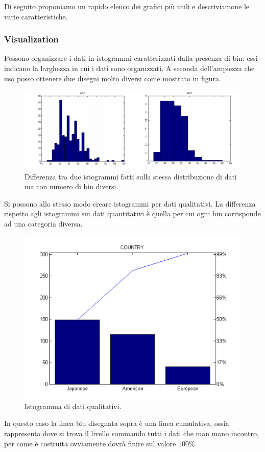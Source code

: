 Di seguito proponiamo un rapido elenco dei grafici più utili e descriviamone le varie caratteristiche.

\subsubsection{Visualization}

Possono organizzare i dati in istogrammi caratterizzati dalla presenza di bin: essi indicano la larghezza in cui i dati sono organizzati. A seconda dell'ampiezza che uso posso ottenere due disegni molto diversi come mostrato in figura.


\begin{figure}[H]
	\centering
	\includegraphics[height=0.35 \linewidth]{introduction/pict/istogramma_quant.png}
	\caption{Differenza tra due istogrammi fatti sulla stessa distribuzione di dati ma con numero di bin diversi.}
\end{figure}


Si possono allo stesso modo creare istogrammi per dati qualitativi. La differenza rispetto agli istogrammi sui dati quantitativi è quella per cui ogni bin corrisponde ad una categoria diversa.

\begin{figure}[H]
	\centering
	\includegraphics[height=0.3 \linewidth]{introduction/pict/istogramma_qual.png}
	\caption{Istogramma di dati qualitativi.}
\end{figure}

In questo caso la linea blu disegnata sopra è una linea cumulativa, ossia rappresenta dove si trova il livello sommando tutti i dati che man mano incontro, per come è costruita ovviamente dovrà finire sul valore $100\%$


